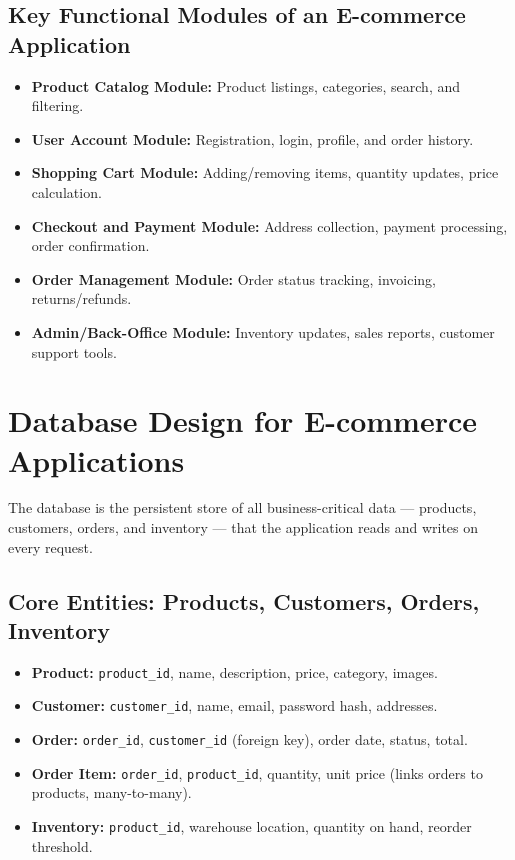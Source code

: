 \documentclass[11pt,a4paper]{article}
\begin{document}
\subsection{Key Functional Modules of an E-commerce Application}
\begin{conceptbox}
\begin{itemize}[leftmargin=*]
  \item \textbf{Product Catalog Module:} Product listings, categories, search, and filtering.
  \item \textbf{User Account Module:} Registration, login, profile, and order history.
  \item \textbf{Shopping Cart Module:} Adding/removing items, quantity updates, price calculation.
  \item \textbf{Checkout and Payment Module:} Address collection, payment processing, order confirmation.
  \item \textbf{Order Management Module:} Order status tracking, invoicing, returns/refunds.
  \item \textbf{Admin/Back-Office Module:} Inventory updates, sales reports, customer support tools.
\end{itemize}
\end{conceptbox}

\section{Database Design for E-commerce Applications}

\begin{definitionbox}
The database is the persistent store of all business-critical data --- products, customers, orders, and inventory --- that the application reads and writes on every request.
\end{definitionbox}

\subsection{Core Entities: Products, Customers, Orders, Inventory}
\begin{itemize}[leftmargin=*]
  \item \textbf{Product:} \texttt{product\_id}, name, description, price, category, images.
  \item \textbf{Customer:} \texttt{customer\_id}, name, email, password hash, addresses.
  \item \textbf{Order:} \texttt{order\_id}, \texttt{customer\_id} (foreign key), order date, status, total.
  \item \textbf{Order Item:} \texttt{order\_id}, \texttt{product\_id}, quantity, unit price (links orders to products, many-to-many).
  \item \textbf{Inventory:} \texttt{product\_id}, warehouse location, quantity on hand, reorder threshold.
\end{itemize}
\end{document}
